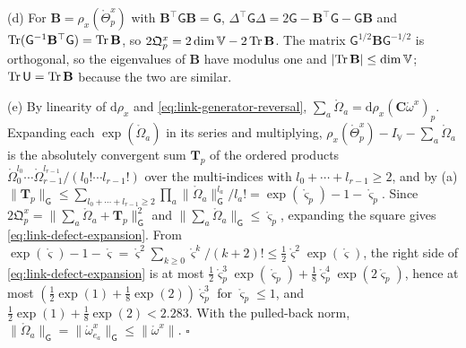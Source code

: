 (d) For $\mathbf B=\rho_x(\mathring\Theta^x_p)$ with $\mathbf B^\top\mathsf G\mathbf B=\mathsf G$,
$\Delta^\top\mathsf G\Delta=2\mathsf G-\mathbf B^\top\mathsf G-\mathsf G\mathbf B$ and
$\operatorname{Tr}(\mathsf G^{-1}\mathbf B^\top\mathsf G)=\operatorname{Tr}\mathbf B$, so
$2\mathfrak Q^x_p=2\dim\mathbb V-2\operatorname{Tr}\mathbf B$. The matrix $\mathsf G^{1/2}\mathbf B\mathsf G^{-1/2}$ is
orthogonal, so the eigenvalues of $\mathbf B$ have modulus one and
$\lvert\operatorname{Tr}\mathbf B\rvert\leq\dim\mathbb V$; $\operatorname{Tr}\mathsf U=\operatorname{Tr}\mathbf B$ because the two are similar.

(e) By linearity of $\mathrm d\rho_x$ and \cref{eq:link-generator-reversal},
$\sum_a\mathring\Omega_a=\mathrm d\rho_x(\mathbf C\mathring\omega^x)_p$. Expanding each $\exp(\mathring\Omega_a)$ in its
series and multiplying, $\rho_x(\mathring\Theta^x_p)-I_{\mathbb V}-\sum_a\mathring\Omega_a$ is the absolutely
convergent sum $\mathbf T_p$ of the ordered products
$\mathring\Omega_0^{l_0}\cdots\mathring\Omega_{r-1}^{l_{r-1}}/(l_0!\cdots l_{r-1}!)$ over the multi-indices with
$l_0+\cdots+l_{r-1}\geq2$, and by (a)
$\lVert\mathbf T_p\rVert_{\mathsf G}\leq\sum_{l_0+\cdots+l_{r-1}\geq2}\prod_a\lVert\mathring\Omega_a\rVert_{\mathsf G}^{l_a}/l_a!
=\exp(\mathring\varsigma_p)-1-\mathring\varsigma_p$. Since
$2\mathfrak Q^x_p=\lVert\sum_a\mathring\Omega_a+\mathbf T_p\rVert^2_{\mathsf G}$ and
$\lVert\sum_a\mathring\Omega_a\rVert_{\mathsf G}\leq\mathring\varsigma_p$, expanding the square gives
\cref{eq:link-defect-expansion}. From
$\exp(\mathring\varsigma)-1-\mathring\varsigma=\mathring\varsigma^2\sum_{k\geq0}\mathring\varsigma^k/(k+2)!\leq\tfrac12\mathring\varsigma^2\exp(\mathring\varsigma)$,
the right side of \cref{eq:link-defect-expansion} is at most
$\tfrac12\mathring\varsigma_p^3\exp(\mathring\varsigma_p)+\tfrac18\mathring\varsigma_p^4\exp(2\mathring\varsigma_p)$,
hence at most $(\tfrac12\exp(1)+\tfrac18\exp(2))\mathring\varsigma_p^3$ for $\mathring\varsigma_p\leq1$,
and $\tfrac12\exp(1)+\tfrac18\exp(2)<2.283$. With the pulled-back norm,
$\lVert\mathring\Omega_a\rVert_{\mathsf G}=\lVert\mathring\omega^x_{e_a}\rVert_{\mathsf G}\leq\lVert\mathring\omega^x\rVert$.
\hfill$\square$

